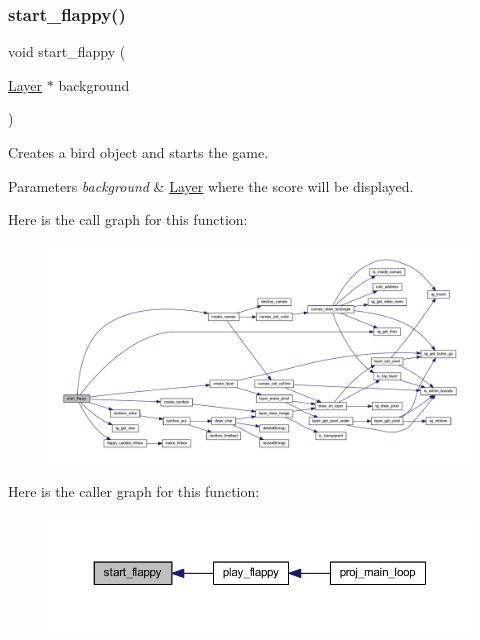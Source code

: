 \subsubsection{\texorpdfstring{start\+\_\+flappy()}{start\_flappy()}}
{\footnotesize\ttfamily void start\+\_\+flappy (\begin{DoxyParamCaption}\item[{\mbox{\hyperlink{struct_layer}{Layer}} $\ast$}]{background }\end{DoxyParamCaption})}



Creates a bird object and starts the game. 


\begin{DoxyParams}{Parameters}
{\em background} & \mbox{\hyperlink{struct_layer}{Layer}} where the score will be displayed. \\
\hline
\end{DoxyParams}
Here is the call graph for this function\+:\nopagebreak
\begin{figure}[H]
\begin{center}
\leavevmode
\includegraphics[width=350pt]{group__flappy_ga5c94499758654ce3c58278cdacb968c2_cgraph}
\end{center}
\end{figure}
Here is the caller graph for this function\+:\nopagebreak
\begin{figure}[H]
\begin{center}
\leavevmode
\includegraphics[width=350pt]{group__flappy_ga5c94499758654ce3c58278cdacb968c2_icgraph}
\end{center}
\end{figure}


